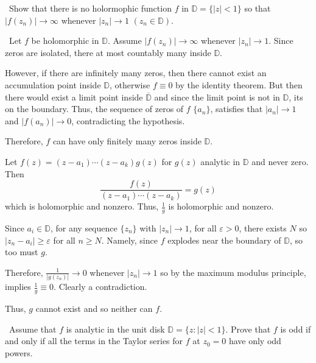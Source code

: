 \documentclass[12pt]{Qual}
\begin{document}
\begin{problem} $\,$
Show that there is no holormophic function $f$ in $\mathbb{D}=\{|z|<1\}$ so that $|f(z_n)|\to\infty$ whenever $|z_n|\to 1$ $(z_n\in\mathbb{D})$.
\end{problem}


\begin{solution}$\,$
Let $f$ be holomorphic in $\mathbb{D}$. Assume $|f(z_n)|\to\infty$ whenever $|z_n|\to 1$. Since zeros are isolated, there at most countably many inside $\mathbb{D}$.

However, if there are infinitely many zeros, then there cannot exist an accumulation point inside $\mathbb{D}$, otherwise $f\equiv 0$ by the identity theorem. But then there would exist a limit point inside $\overline{\mathbb{D}}$ and since the limit point is not in $\mathbb{D}$, its on the boundary. Thus, the sequence of zeros of $f$ $\{a_n\}$, satisfies that $|a_n|\to1$ and $|f(a_n)|\to0$, contradicting the hypothesis.


Therefore, $f$ can have only finitely many zeros inside $\mathbb{D}$.

Let $f(z)=(z-a_1)\cdots(z-a_k)g(z)$ for $g(z)$ analytic in $\mathbb{D}$ and never zero. Then $$\frac{f(z)}{(z-a_1)\cdots(z-a_k)}=g(z)$$ which is holomorphic and nonzero. Thus, $\frac{1}{g}$ is holomorphic and nonzero.

Since $a_i\in\mathbb{D}$, for any sequence $\{z_n\}$ with $|z_n|\to 1$, for all $\varepsilon>0$, there exists $N$ so $|z_n-a_i|\ge\varepsilon$ for all $n\ge N$. Namely, since $f$ explodes near the boundary of $\mathbb{D}$, so too must $g$.

Therefore, $\frac{1}{|g(z_n)|}\to0$ whenever $|z_n|\to1$ so by the maximum modulus principle, implies $\frac{1}{g}\equiv0$. Clearly a contradiction.

Thus, $g$ cannot exist and so neither can $f$.
\end{solution}
\newpage



\begin{problem} $\,$
Assume that $f$ is analytic in the unit disk $\mathbb{D}=\{z:|z|<1\}.$ Prove that $f$ is odd if and only if all the terms in the Taylor series for $f$ at $z_0=0$ have only odd powers.
\end{problem}
\end{document}
